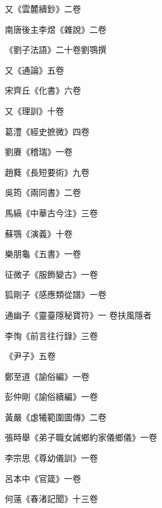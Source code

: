 \begin{pinyinscope}
 又《雲麓續鈔》二卷



 南唐後主李煜《雜說》二卷



 《劉子法語》二十卷劉鶚撰



 又《通論》五卷



 宋齊丘《化書》六卷



 又《理訓》十卷



 葛澧《經史摭微》四卷



 劉賡《稽瑞》一卷



 趙蕤《長短要術》九卷



 吳筠《兩同書》二卷



 馬縞《中華古今注》三卷



 蘇鶚《演義》十卷



 樂朋龜《五書》一卷



 征微子《服飾變古》一卷



 狐剛子《感應類從譜》一卷



 通幽子《靈臺隱秘寶符》一
 卷扶風隱者



 李恂《前言往行錄》三卷



 《尹子》五卷



 鄭至道《諭俗編》一卷



 彭仲剛《諭俗續編》一卷



 黃嚴《虙犧範圍圖傳》二卷



 張時舉《弟子職女誡鄉約家儀鄉儀》一卷



 李宗思《尊幼儀訓》一卷



 呂本中《官箴》一卷



 何薳《春渚記聞》十三卷




\end{pinyinscope}
